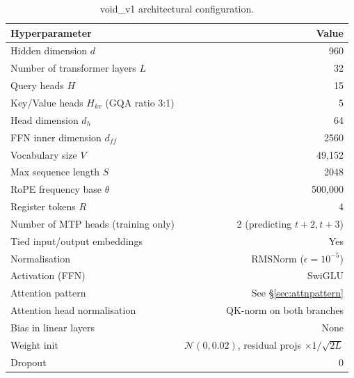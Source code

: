 \documentclass[11pt,a4paper]{article}
\theoremstyle{definition}
\theoremstyle{remark}
\begin{document}
\begin{table}[h]
\centering
\small
\begin{tabular}{lr}
\toprule
\textbf{Hyperparameter} & \textbf{Value} \\
\midrule
Hidden dimension $d$                                 & 960 \\
Number of transformer layers $L$                     & 32 \\
Query heads $H$                                      & 15 \\
Key/Value heads $H_{kv}$ (GQA ratio 3:1)             & 5 \\
Head dimension $d_h$                                 & 64 \\
FFN inner dimension $d_{ff}$                         & 2560 \\
Vocabulary size $V$                                  & 49{,}152 \\
Max sequence length $S$                              & 2048 \\
RoPE frequency base $\theta$                         & 500{,}000 \\
Register tokens $R$                                  & 4 \\
Number of MTP heads (training only)                  & 2 (predicting $t+2, t+3$) \\
Tied input/output embeddings                         & Yes \\
Normalisation                                        & RMSNorm ($\epsilon = 10^{-5}$) \\
Activation (FFN)                                     & SwiGLU \\
Attention pattern                                    & See \S\ref{sec:attnpattern} \\
Attention head normalisation                         & QK-norm on both branches \\
Bias in linear layers                                & None \\
Weight init                                          & $\mathcal{N}(0, 0.02)$, residual projs $\times 1/\sqrt{2L}$ \\
Dropout                                              & 0 \\
\bottomrule
\end{tabular}
\caption{void\_v1 architectural configuration.}
\label{tab:config}
\end{table}
\end{document}
